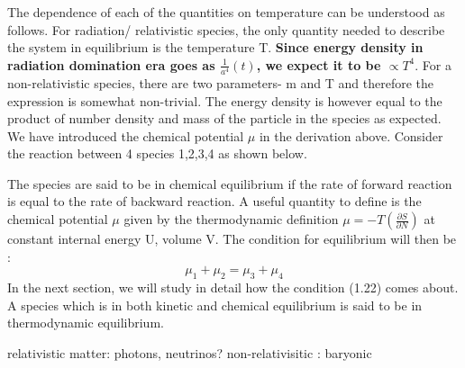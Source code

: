 \documentclass[12pt,a4paper,oneside]{book}
\begin{document}
 \newline The dependence of each of the quantities on temperature can be understood as follows. For radiation/ relativistic species, the only quantity needed to describe the system in equilibrium is the temperature T. \textbf{Since energy density in radiation domination era goes as $\frac{1}{a^{4}}(t)$, we expect it to be $\propto T^{4}$}. For a non-relativistic species, there are two parameters- m and T and therefore the expression is somewhat non-trivial. The energy density is however equal to the product of number density and mass of the particle in the species as expected. We have introduced the chemical potential $\mu$ in the derivation above. Consider the reaction between 4 species 1,2,3,4 as shown below.
  \begin{center}
 \end{center} 
 The species are said to be in chemical equilibrium if the rate of forward reaction is equal to the rate of backward reaction. A useful quantity to define is the chemical potential $\mu$ given by the thermodynamic definition  $\mu = -T (\frac{\partial S}{\partial N}) $ at constant internal energy U, volume V. The condition for equilibrium will then be :
\begin{equation}
    \mu_{1} + \mu_{2} = \mu_{3} + \mu_{4}
\end{equation}
In the next section, we will study in detail how the condition (1.22) comes about. A species which is in both kinetic and chemical equilibrium is said to be in thermodynamic equilibrium.

relativistic matter: photons, neutrinos?
non-relativisitic : baryonic
\end{document}
